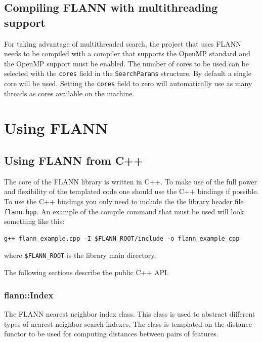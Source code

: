 \documentclass[letter,10pt]{article}
\begin{document}
\subsection{Compiling FLANN with multithreading support}

For taking advantage of multithreaded search, the project that uses FLANN needs to be compiled with a compiler that 
supports the OpenMP standard and the OpenMP support must be enabled. The number of cores to be used can be selected with 
the \texttt{cores} field in the \texttt{SearchParams} structure. By default a single core will be used. 
Setting the \texttt{cores} field to zero will automatically use as many threads as cores available on the machine.

\section{Using FLANN}

\subsection{Using FLANN from C++}

The core of the FLANN library is written in C++. To make use of the full power 
and flexibility of the templated code one should use the C++ bindings if possible. 
To use the C++ bindings you only need to include the  the library header file \texttt{flann.hpp}. An example
of the compile command that must be used will look something like this:
\begin{Verbatim}[fontsize=\footnotesize]
g++ flann_example.cpp -I $FLANN_ROOT/include -o flann_example_cpp
\end{Verbatim}
where \texttt{\$FLANN\_ROOT} is the library main directory.

The following sections describe the public C++ API.

\subsubsection{flann::Index}
\label{sec:flann::Index}
The FLANN nearest neighbor index class. This class is used to abstract different types of nearest neighbor search
indexes. The class is templated on the distance functor to be used for computing distances between pairs of features. 
\end{document}
